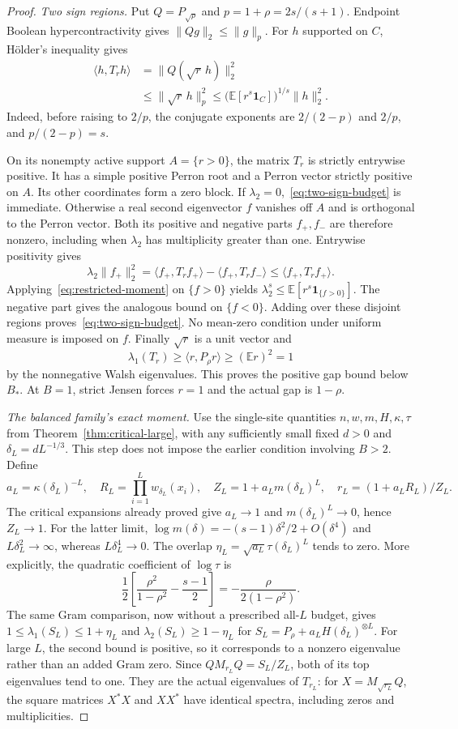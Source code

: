 \documentclass[11pt]{article}
\begin{document}
\begin{proof}
\emph{Two sign regions.}
Put $Q=P_{\sqrt\rho}$ and $p=1+\rho=2s/(s+1)$.
Endpoint Boolean hypercontractivity gives $\|Qg\|_2\le\|g\|_p$.
For $h$ supported on $C$, H\"older's inequality gives
\begin{align}
 \langle h,T_rh\rangle
 &=\|Q(\sqrt r\,h)\|_2^2\nonumber\\
 &\le\|\sqrt r\,h\|_p^2
 \le\bigl(\mathbb E[r^s\mathbf1_C]\bigr)^{1/s}\|h\|_2^2.
 \label{eq:restricted-moment}
\end{align}
Indeed, before raising to $2/p$, the conjugate exponents are
$2/(2-p)$ and $2/p$, and $p/(2-p)=s$.

On its nonempty active support $A=\{r>0\}$, the matrix $T_r$
is strictly entrywise positive. It has a simple positive Perron root
and a Perron vector strictly positive on $A$. Its other coordinates
form a zero block. If $\lambda_2=0$,~\eqref{eq:two-sign-budget}
is immediate. Otherwise a real second eigenvector $f$ vanishes off
$A$ and is orthogonal to the Perron vector. Both its positive and
negative parts $f_+,f_-$ are therefore nonzero, including when
$\lambda_2$ has multiplicity greater than one.
Entrywise positivity gives
\[
 \lambda_2\|f_+\|_2^2
 =\langle f_+,T_rf_+\rangle-\langle f_+,T_rf_-\rangle
 \le\langle f_+,T_rf_+\rangle.
\]
Applying~\eqref{eq:restricted-moment} on $\{f>0\}$ yields
$\lambda_2^s\le\mathbb E[r^s\mathbf1_{\{f>0\}}]$.
The negative part gives the analogous bound on $\{f<0\}$.
Adding over these disjoint regions proves~\eqref{eq:two-sign-budget}.
No mean-zero condition under uniform measure is imposed on $f$.
Finally $\sqrt r$ is a unit vector and
\[
 \lambda_1(T_r)\ge\langle r,P_\rho r\rangle
 \ge(\mathbb Er)^2=1
\]
by the nonnegative Walsh eigenvalues. This proves the positive gap
bound below $B_*$. At $B=1$, strict Jensen forces $r=1$ and the
actual gap is $1-\rho$.

\emph{The balanced family's exact moment.}
Use the single-site quantities $n,w,m,H,\kappa,\tau$ from
Theorem~\ref{thm:critical-large}, with any sufficiently small fixed
$d>0$ and $\delta_L=dL^{-1/3}$. This step does not impose the
earlier condition involving $B>2$. Define
\[
 a_L=\kappa(\delta_L)^{-L},\quad
 R_L=\prod_{i=1}^Lw_{\delta_L}(x_i),\quad
 Z_L=1+a_Lm(\delta_L)^L,\quad
 r_L=(1+a_LR_L)/Z_L.
\]
The critical expansions already proved give $a_L\to1$ and
$m(\delta_L)^L\to0$, hence $Z_L\to1$. For the latter limit,
$\log m(\delta)=-(s-1)\delta^2/2+O(\delta^4)$ and
$L\delta_L^2\to\infty$, whereas $L\delta_L^4\to0$.
The overlap $\eta_L=\sqrt{a_L}\tau(\delta_L)^L$ tends to zero.
More explicitly, the quadratic coefficient of $\log\tau$ is
\[
 \frac12\left[\frac{\rho^2}{1-\rho^2}-\frac{s-1}{2}\right]
 =-\frac{\rho}{2(1-\rho^2)}.
\]
The same Gram comparison, now without a prescribed all-$L$ budget,
gives $1\le\lambda_1(S_L)\le1+\eta_L$ and
$\lambda_2(S_L)\ge1-\eta_L$ for
$S_L=P_\rho+a_LH(\delta_L)^{\otimes L}$.
For large $L$, the second bound is positive, so it corresponds to
a nonzero eigenvalue rather than an added Gram zero.
Since $QM_{r_L}Q=S_L/Z_L$, both of its top eigenvalues tend to one.
They are the actual eigenvalues of $T_{r_L}$: for
$X=M_{\sqrt{r_L}}Q$, the square matrices $X^*X$ and $XX^*$
have identical spectra, including zeros and multiplicities.


\end{proof}
\end{document}

